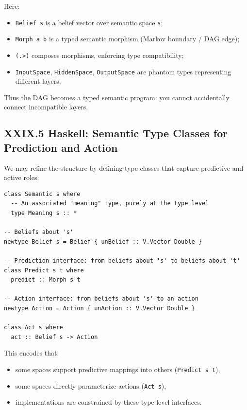 \documentclass[12pt,letterpaper]{article}
\begin{document}
Here:

\begin{itemize}
  \item \verb|Belief s| is a belief vector over semantic space \verb|s|;
  \item \verb|Morph a b| is a typed semantic morphism (Markov boundary / DAG edge);
  \item \verb|(.>)| composes morphisms, enforcing type compatibility;
  \item \verb|InputSpace|, \verb|HiddenSpace|, \verb|OutputSpace| are phantom types representing different layers.
\end{itemize}

Thus the DAG becomes a typed semantic program: you cannot accidentally connect incompatible layers.

\subsection{XXIX.5 Haskell: Semantic Type Classes for Prediction and Action}

We may refine the structure by defining type classes that capture predictive and active roles:

\begin{verbatim}
class Semantic s where
  -- An associated "meaning" type, purely at the type level
  type Meaning s :: *

-- Beliefs about 's'
newtype Belief s = Belief { unBelief :: V.Vector Double }

-- Prediction interface: from beliefs about 's' to beliefs about 't'
class Predict s t where
  predict :: Morph s t

-- Action interface: from beliefs about 's' to an action
newtype Action = Action { unAction :: V.Vector Double }

class Act s where
  act :: Belief s -> Action
\end{verbatim}

This encodes that:

\begin{itemize}
  \item some spaces support predictive mappings into others (\verb|Predict s t|),
  \item some spaces directly parameterize actions (\verb|Act s|),
  \item implementations are constrained by these type-level interfaces.
\end{itemize}
\end{document}
